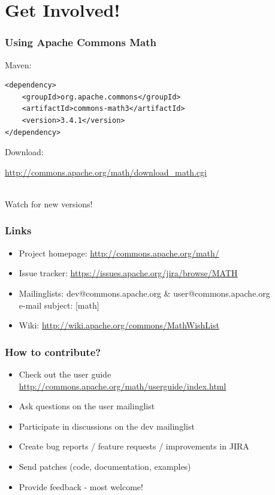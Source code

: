 \documentclass[14pt,mathserif]{beamer}
\begin{document}
\section[Getting involved]{Get Involved!}
\begin{frame}[fragile]
  \frametitle{Using Apache Commons Math}

Maven:

\begin{verbatim}
<dependency>
	<groupId>org.apache.commons</groupId>
	<artifactId>commons-math3</artifactId>
	<version>3.4.1</version>
</dependency>
\end{verbatim}

Download:\\
\begin{small}
\url{http://commons.apache.org/math/download_math.cgi} \\
\end{small}
\\
Watch for new versions!           
\end{frame}

\begin{frame}
  \frametitle{Links}

\begin{itemize}
  \item Project homepage: \url{http://commons.apache.org/math/}
  \item Issue tracker: \url{https://issues.apache.org/jira/browse/MATH}
  \item Mailinglists: dev@commons.apache.org \& user@commons.apache.org \\
  e-mail subject: [math]
  \item Wiki: \url{http://wiki.apache.org/commons/MathWishList}
\end{itemize}

\end{frame}

\begin{frame}
  \frametitle{How to contribute?}

\begin{itemize}
  \item Check out the user guide \url{http://commons.apache.org/math/userguide/index.html}
  \item Ask questions on the user mailinglist
  \item Participate in discussions on the dev mailinglist
  \item Create bug reports / feature requests / improvements in JIRA
  \item Send patches (code, documentation, examples)
  \item Provide feedback - most welcome!
\end{itemize}

\end{frame}
\end{document}

